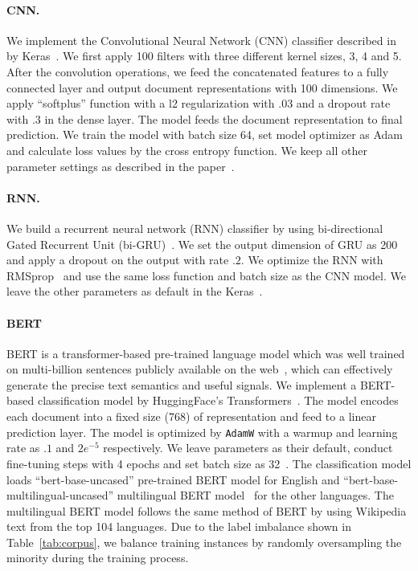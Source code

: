 \paragraph{CNN.} 
We implement the Convolutional Neural Network (CNN) classifier described in~\cite{kim2014convolutional,zimmerman2018improving} by Keras~\cite{chollet2015keras}.
We first apply 100 filters with three different kernel sizes, 3, 4 and 5.
After the convolution operations, we feed the concatenated features to a fully connected layer and output document representations with 100 dimensions.
We apply ``softplus'' function with a l2 regularization with $.03$ and a dropout rate with $.3$ in the dense layer.
The model feeds the document representation to final prediction.
We train the model with batch size 64, set model optimizer as Adam~\cite{kingma2014adam} and calculate loss values by the cross entropy function.
We keep all other parameter settings as described in the paper~\cite{kim2014convolutional}.


\paragraph{RNN.}
We build a recurrent neural network (RNN) classifier by using bi-directional Gated Recurrent Unit (bi-GRU)~\cite{chung2014empirical,park2018reducing}.
We set the output dimension of GRU as 200 and apply a dropout on the output with rate $.2$.
We optimize the RNN with RMSprop~\cite{tieleman2012lecture} and use the same loss function and batch size as the CNN model.
We leave the other parameters as default in the Keras~\cite{chollet2015keras}.


\paragraph{BERT}
BERT is a transformer-based pre-trained language model which was well trained on multi-billion sentences publicly available on the web~\cite{devlin2019bert}, which can effectively generate the precise text semantics and useful signals.
We implement a BERT-based classification model by HuggingFace's Transformers~\cite{Wolf2019HuggingFacesTS}.
The model encodes each document into a fixed size (768) of representation and feed to a linear prediction layer.
The model is optimized by \texttt{AdamW} with a warmup and learning rate as $.1$ and $2e^{-5}$ respectively.
We leave parameters as their default, conduct fine-tuning steps with 4 epochs and set batch size as 32~\cite{sun2019fine}.
The classification model loads ``bert-base-uncased'' pre-trained BERT model for English and ``bert-base-multilingual-uncased'' multilingual BERT model~\cite{gertner2019mitre} for the other languages.
The multilingual BERT model follows the same method of BERT by using Wikipedia text from the top 104 languages.
Due to the label imbalance shown in Table~\ref{tab:corpus}, we balance training instances by randomly oversampling the minority during the training process.


